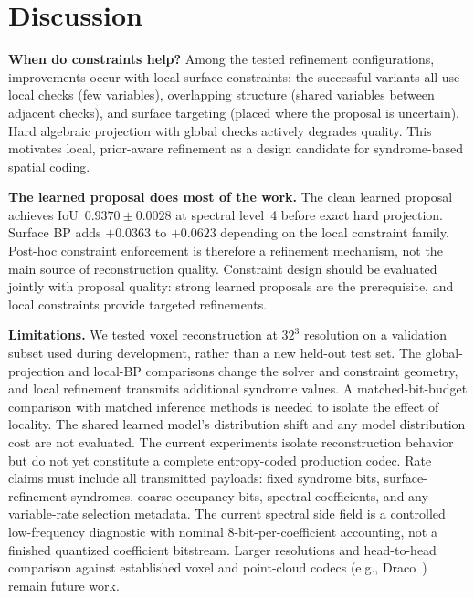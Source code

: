 \documentclass[11pt,a4paper]{article}
\begin{document}
\section{Discussion}

\textbf{When do constraints help?}
Among the tested refinement configurations, improvements occur with
local surface constraints: the successful variants all use
local checks (few variables), overlapping structure (shared variables
between adjacent checks), and surface targeting (placed where the
proposal is uncertain). Hard algebraic projection with global checks
actively degrades quality. This motivates local, prior-aware refinement as a design candidate for
syndrome-based spatial coding.

\textbf{The learned proposal does most of the work.}
The clean learned proposal achieves IoU~$0.9370\pm0.0028$ at spectral level~4
before exact hard projection.
Surface BP adds $+0.0363$ to $+0.0623$ depending on the local constraint
family. Post-hoc constraint enforcement is therefore a refinement mechanism,
not the main source of reconstruction quality. Constraint design should be
evaluated jointly with proposal quality: strong learned proposals are the
prerequisite, and local constraints provide targeted refinements.

\textbf{Limitations.}
We tested voxel reconstruction at $32^3$ resolution on a validation
subset used during development, rather than a new held-out test set.
The global-projection and local-BP comparisons change the solver and
constraint geometry, and local refinement transmits additional syndrome
values. A matched-bit-budget comparison with matched inference methods
is needed to isolate the effect of locality. The shared learned model's
distribution shift and any model distribution cost are not evaluated. The current
experiments isolate reconstruction behavior but do not yet constitute a
complete entropy-coded production codec. Rate claims must include all
transmitted payloads: fixed syndrome bits, surface-refinement syndromes,
coarse occupancy bits, spectral coefficients, and any variable-rate
selection metadata. The current spectral side field is a controlled
low-frequency diagnostic with nominal 8-bit-per-coefficient accounting, not a
finished quantized coefficient bitstream. Larger resolutions and head-to-head comparison
against established voxel and point-cloud codecs (e.g.,
Draco~\cite{draco}) remain future work.

\end{document}
